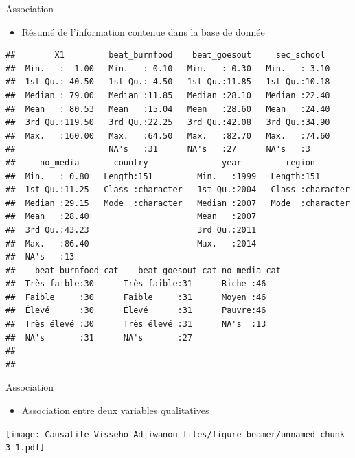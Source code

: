 \documentclass[ignorenonframetext,]{beamer}
\providecommand{\tightlist}{%
  \setlength{\itemsep}{0pt}\setlength{\parskip}{0pt}}
\begin{document}
\begin{frame}[fragile]{Association}
\protect\hypertarget{association-3}{}

\begin{itemize}
\tightlist
\item
  Résumé de l'information contenue dans la base de donnée
\end{itemize}

\begin{verbatim}
##        X1         beat_burnfood    beat_goesout     sec_school   
##  Min.   :  1.00   Min.   : 0.10   Min.   : 0.30   Min.   : 3.10  
##  1st Qu.: 40.50   1st Qu.: 4.50   1st Qu.:11.85   1st Qu.:10.18  
##  Median : 79.00   Median :11.85   Median :28.10   Median :22.40  
##  Mean   : 80.53   Mean   :15.04   Mean   :28.60   Mean   :24.40  
##  3rd Qu.:119.50   3rd Qu.:22.25   3rd Qu.:42.08   3rd Qu.:34.90  
##  Max.   :160.00   Max.   :64.50   Max.   :82.70   Max.   :74.60  
##                   NA's   :31      NA's   :27      NA's   :3      
##     no_media       country               year         region         
##  Min.   : 0.80   Length:151         Min.   :1999   Length:151        
##  1st Qu.:11.25   Class :character   1st Qu.:2004   Class :character  
##  Median :29.15   Mode  :character   Median :2007   Mode  :character  
##  Mean   :28.40                      Mean   :2007                     
##  3rd Qu.:43.23                      3rd Qu.:2011                     
##  Max.   :86.40                      Max.   :2014                     
##  NA's   :13                                                          
##    beat_burnfood_cat    beat_goesout_cat no_media_cat
##  Très faible:30      Très faible:31      Riche :46   
##  Faible     :30      Faible     :31      Moyen :46   
##  Élevé      :30      Élevé      :31      Pauvre:46   
##  Très élevé :30      Très élevé :31      NA's  :13   
##  NA's       :31      NA's       :27                  
##                                                      
## 
\end{verbatim}

\end{frame}

\begin{frame}{Association}
\protect\hypertarget{association-4}{}

\begin{itemize}
\tightlist
\item
  Association entre deux variables qualitatives
\end{itemize}

\texttt{[image: Causalite\_Visseho\_Adjiwanou\_files/figure-beamer/unnamed-chunk-3-1.pdf]}

\end{frame}
\end{document}
